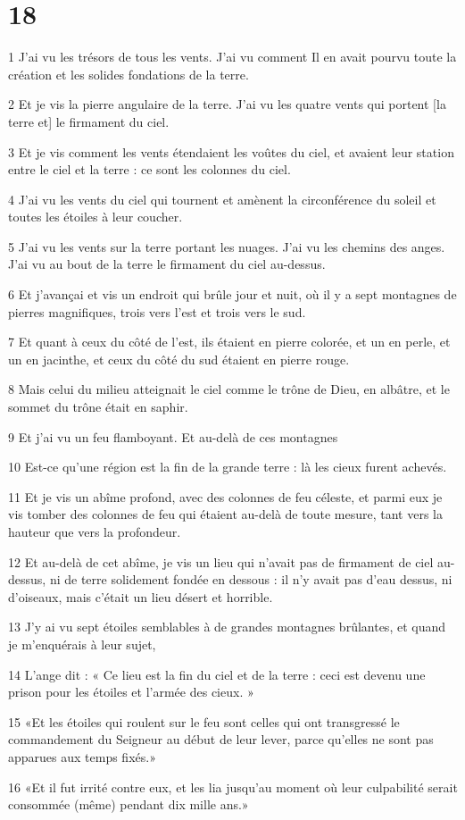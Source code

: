 \chapter{18}

\par 1 J'ai vu les trésors de tous les vents. J'ai vu comment Il en avait pourvu toute la création et les solides fondations de la terre.
\par 2 Et je vis la pierre angulaire de la terre. J'ai vu les quatre vents qui portent [la terre et] le firmament du ciel.
\par 3 Et je vis comment les vents étendaient les voûtes du ciel, et avaient leur station entre le ciel et la terre : ce sont les colonnes du ciel.
\par 4 J'ai vu les vents du ciel qui tournent et amènent la circonférence du soleil et toutes les étoiles à leur coucher.
\par 5 J'ai vu les vents sur la terre portant les nuages. J'ai vu les chemins des anges. J'ai vu au bout de la terre le firmament du ciel au-dessus.
\par 6 Et j'avançai et vis un endroit qui brûle jour et nuit, où il y a sept montagnes de pierres magnifiques, trois vers l'est et trois vers le sud.
\par 7 Et quant à ceux du côté de l'est, ils étaient en pierre colorée, et un en perle, et un en jacinthe, et ceux du côté du sud étaient en pierre rouge.
\par 8 Mais celui du milieu atteignait le ciel comme le trône de Dieu, en albâtre, et le sommet du trône était en saphir.
\par 9 Et j'ai vu un feu flamboyant. Et au-delà de ces montagnes
\par 10 Est-ce qu'une région est la fin de la grande terre : là les cieux furent achevés.
\par 11 Et je vis un abîme profond, avec des colonnes de feu céleste, et parmi eux je vis tomber des colonnes de feu qui étaient au-delà de toute mesure, tant vers la hauteur que vers la profondeur.
\par 12 Et au-delà de cet abîme, je vis un lieu qui n'avait pas de firmament de ciel au-dessus, ni de terre solidement fondée en dessous : il n'y avait pas d'eau dessus, ni d'oiseaux, mais c'était un lieu désert et horrible.
\par 13 J'y ai vu sept étoiles semblables à de grandes montagnes brûlantes, et quand je m'enquérais à leur sujet,
\par 14 L'ange dit : « Ce lieu est la fin du ciel et de la terre : ceci est devenu une prison pour les étoiles et l'armée des cieux. »
\par 15 «Et les étoiles qui roulent sur le feu sont celles qui ont transgressé le commandement du Seigneur au début de leur lever, parce qu'elles ne sont pas apparues aux temps fixés.»
\par 16 «Et il fut irrité contre eux, et les lia jusqu'au moment où leur culpabilité serait consommée (même) pendant dix mille ans.»


